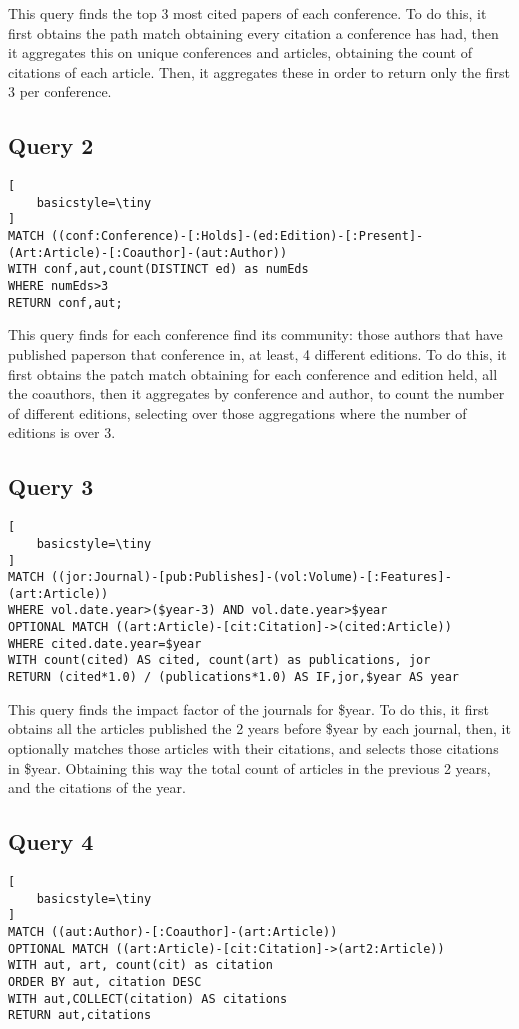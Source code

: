 \documentclass[11pt, a4paper]{article}
\begin{document}
This query finds the top 3 most cited papers of each conference. To do this, it first obtains the path match obtaining every citation a conference has had, then it aggregates this on unique conferences and articles, obtaining the count of citations of each article. Then, it aggregates these in order to return only the first 3 per conference.

\subsection{Query 2}
\begin{lstlisting}[
    basicstyle=\tiny
]
MATCH ((conf:Conference)-[:Holds]-(ed:Edition)-[:Present]-(Art:Article)-[:Coauthor]-(aut:Author))
WITH conf,aut,count(DISTINCT ed) as numEds
WHERE numEds>3
RETURN conf,aut;
  \end{lstlisting}

This query finds for each conference find its community: those authors that have published paperson that conference in, at least, 4 different editions. To do this, it first obtains the patch match obtaining for each conference and edition held, all the coauthors, then it aggregates by conference and author, to count the number of different editions, selecting over those aggregations where the number of editions is over 3.

\subsection{Query 3}
\begin{lstlisting}[
    basicstyle=\tiny
]
MATCH ((jor:Journal)-[pub:Publishes]-(vol:Volume)-[:Features]-(art:Article))
WHERE vol.date.year>($year-3) AND vol.date.year>$year
OPTIONAL MATCH ((art:Article)-[cit:Citation]->(cited:Article))
WHERE cited.date.year=$year
WITH count(cited) AS cited, count(art) as publications, jor
RETURN (cited*1.0) / (publications*1.0) AS IF,jor,$year AS year
 \end{lstlisting}

This query finds  the  impact  factor  of  the  journals for \$year. To do this, it first obtains all the articles published the 2 years before \$year by each journal, then, it optionally matches those articles with their citations, and selects those citations in \$year. Obtaining this way the total count of articles in the previous 2 years, and the citations of the year.

\subsection{Query 4}
\begin{lstlisting}[
    basicstyle=\tiny
]
MATCH ((aut:Author)-[:Coauthor]-(art:Article))
OPTIONAL MATCH ((art:Article)-[cit:Citation]->(art2:Article))
WITH aut, art, count(cit) as citation
ORDER BY aut, citation DESC
WITH aut,COLLECT(citation) AS citations
RETURN aut,citations
\end{lstlisting}
\end{document}
